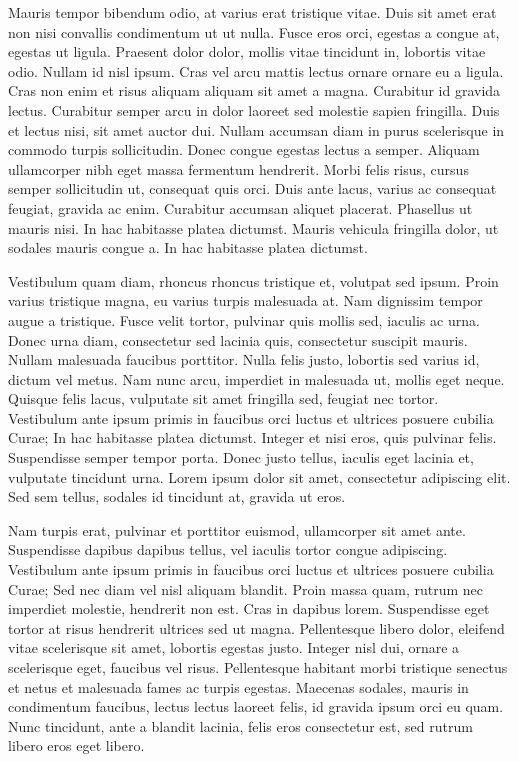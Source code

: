 Mauris tempor bibendum odio, at varius erat tristique vitae. Duis sit amet erat
non nisi convallis condimentum ut ut nulla. Fusce eros orci, egestas a congue
at, egestas ut ligula. Praesent dolor dolor, mollis vitae tincidunt in, lobortis
vitae odio. Nullam id nisl ipsum. Cras vel arcu mattis lectus ornare ornare eu a
ligula. Cras non enim et risus aliquam aliquam sit amet a magna. Curabitur id
gravida lectus. Curabitur semper arcu in dolor laoreet sed molestie sapien
fringilla. Duis et lectus nisi, sit amet auctor dui. Nullam accumsan diam in
purus scelerisque in commodo turpis sollicitudin. Donec congue egestas lectus a
semper. Aliquam ullamcorper nibh eget massa fermentum hendrerit. Morbi felis
risus, cursus semper sollicitudin ut, consequat quis orci. Duis ante lacus,
varius ac consequat feugiat, gravida ac enim. Curabitur accumsan aliquet
placerat. Phasellus ut mauris nisi. In hac habitasse platea dictumst. Mauris
vehicula fringilla dolor, ut sodales mauris congue a. In hac habitasse platea
dictumst.

Vestibulum quam diam, rhoncus rhoncus tristique et, volutpat sed ipsum. Proin
varius tristique magna, eu varius turpis malesuada at. Nam dignissim tempor
augue a tristique. Fusce velit tortor, pulvinar quis mollis sed, iaculis ac
urna. Donec urna diam, consectetur sed lacinia quis, consectetur suscipit
mauris. Nullam malesuada faucibus porttitor. Nulla felis justo, lobortis sed
varius id, dictum vel metus. Nam nunc arcu, imperdiet in malesuada ut, mollis
eget neque. Quisque felis lacus, vulputate sit amet fringilla sed, feugiat nec
tortor. Vestibulum ante ipsum primis in faucibus orci luctus et ultrices posuere
cubilia Curae; In hac habitasse platea dictumst. Integer et nisi eros, quis
pulvinar felis. Suspendisse semper tempor porta. Donec justo tellus, iaculis
eget lacinia et, vulputate tincidunt urna. Lorem ipsum dolor sit amet,
consectetur adipiscing elit. Sed sem tellus, sodales id tincidunt at, gravida ut
eros.

Nam turpis erat, pulvinar et porttitor euismod, ullamcorper sit amet ante.
Suspendisse dapibus dapibus tellus, vel iaculis tortor congue adipiscing.
Vestibulum ante ipsum primis in faucibus orci luctus et ultrices posuere cubilia
Curae; Sed nec diam vel nisl aliquam blandit. Proin massa quam, rutrum nec
imperdiet molestie, hendrerit non est. Cras in dapibus lorem. Suspendisse eget
tortor at risus hendrerit ultrices sed ut magna. Pellentesque libero dolor,
eleifend vitae scelerisque sit amet, lobortis egestas justo. Integer nisl dui,
ornare a scelerisque eget, faucibus vel risus. Pellentesque habitant morbi
tristique senectus et netus et malesuada fames ac turpis egestas. Maecenas
sodales, mauris in condimentum faucibus, lectus lectus laoreet felis, id gravida
ipsum orci eu quam. Nunc tincidunt, ante a blandit lacinia, felis eros
consectetur est, sed rutrum libero eros eget libero.